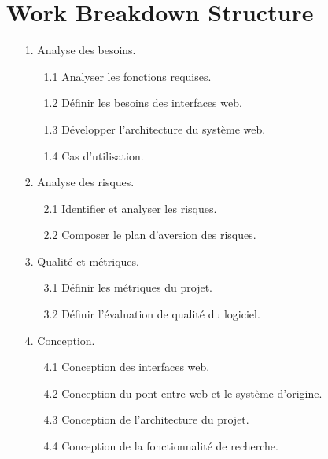 \documentclass[10pt,a4paper]{report}
\begin{document}
\section*{Work Breakdown Structure}
\begin{enumerate}
\item[1.] Analyse des besoins.\\
\begin{enumerate}
\item[1.1] Analyser les fonctions requises.\\
\item[1.2] Définir les besoins des interfaces web.\\
\item[1.3] Développer l'architecture du système web.\\
\item[1.4] Cas d'utilisation.\\
\end{enumerate}
\item[2.] Analyse des risques.\\
\begin{enumerate}
\item[2.1] Identifier et analyser les risques.\\
\item[2.2] Composer le plan d'aversion des risques.\\
\end{enumerate}
\item[3.] Qualité et métriques.\\
\begin{enumerate}
\item[3.1] Définir les métriques du projet.\\
\item[3.2] Définir l'évaluation de qualité du logiciel.\\
\end{enumerate}
\item[4.] Conception.\\
\begin{enumerate}
\item[4.1] Conception des interfaces web.\\
\item[4.2] Conception du pont entre web et le système d'origine.\\
\item[4.3] Conception de l'architecture du projet.\\
\item[4.4] Conception de la fonctionnalité de recherche.\\

\end{enumerate}
\end{enumerate}
\end{document}
